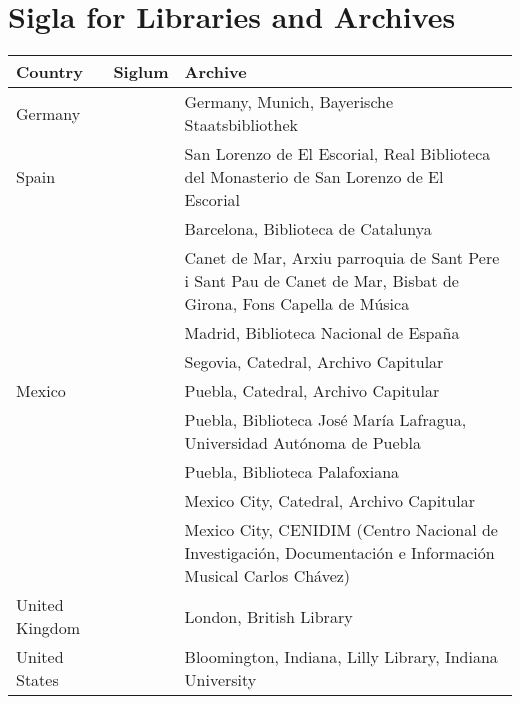\section*{Sigla for Libraries and Archives}

\begin{tabulary}{\linewidth}{llL}
    \toprule
    Country
    & Siglum
    & Archive\\
    \midrule

    Germany 
    & 
    & Germany, Munich, Bayerische Staatsbibliothek\\
    \addlinespace

    Spain 
    & 
    & San Lorenzo de El Escorial, 
    Real Biblioteca del Monasterio de San Lorenzo de El Escorial\\ 

    & 
    & Barcelona, Biblioteca de Catalunya\\

    & 
    & Canet de Mar, Arxiu parroquia de Sant Pere i Sant Pau 
    de Canet de Mar, Bisbat de Girona, Fons Capella de Música\\

    & 
    & Madrid, Biblioteca Nacional de España\\

    & 
    & Segovia, Catedral, Archivo Capitular\\
    \addlinespace

    Mexico
    & 
    & Puebla, Catedral, Archivo Capitular\\

    & 
    & Puebla, Biblioteca José María Lafragua, Universidad Autónoma de Puebla\\

    & 
    & Puebla, Biblioteca Palafoxiana\\

    & 
    & Mexico City, Catedral, Archivo Capitular\\

    & 
    & Mexico City, CENIDIM (Centro Nacional de Investigación, 
    Documentación e Información Musical Carlos Chávez)\\
    \addlinespace

    United Kingdom 
    & 
    & London, British Library\\
    \addlinespace

    United States
    & 
    & Bloomington, Indiana, Lilly Library, Indiana University\\
    \bottomrule
\end{tabulary}

